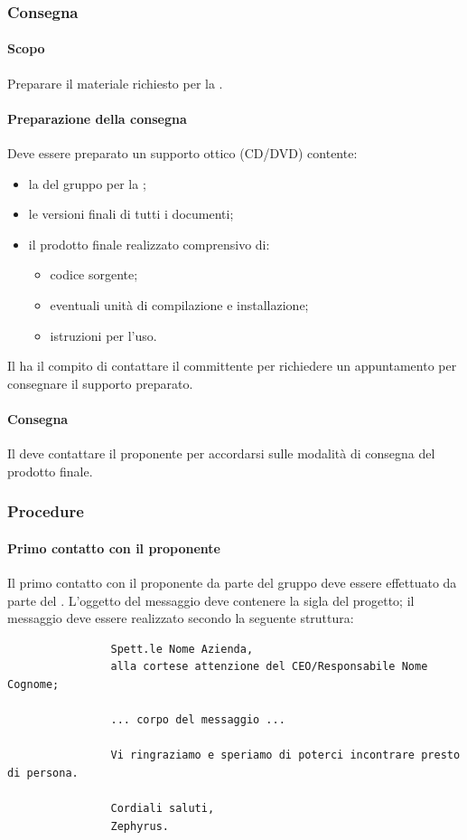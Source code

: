         \subsubsection{Consegna}
	        \paragraph{Scopo}
	        Preparare il materiale richiesto per la \revacc.
	        \paragraph{Preparazione della consegna}
	        Deve essere preparato un supporto ottico (CD/DVD) contente:
		    \begin{itemize}
		    	\item la \ldp{} del gruppo per la \revacc;
		    	\item le versioni finali di tutti i documenti;
		    	\item il prodotto finale realizzato comprensivo di:
			    	\begin{itemize}
			    		\item codice sorgente;
			    		\item eventuali unità di compilazione e installazione;
			    		\item istruzioni per l'uso.
			    	\end{itemize}
		    \end{itemize}
	        Il \responsabilediprogetto{} ha il compito di contattare il committente per richiedere un appuntamento per consegnare il supporto preparato.
	        \paragraph{Consegna}
	        Il \responsabilediprogetto{} deve contattare il proponente per accordarsi sulle modalità di consegna del prodotto finale.
		\subsubsection{Procedure}
			\paragraph{Primo contatto con il proponente}
			Il primo contatto con il proponente da parte del gruppo \zephyrus{} deve essere effettuato da parte del \responsabilediprogetto{}. L'oggetto del messaggio deve contenere la sigla del progetto; il messaggio deve essere realizzato secondo la seguente struttura:
			\bigskip
				\begin{verbatim}
				Spett.le Nome Azienda, 
				alla cortese attenzione del CEO/Responsabile Nome Cognome;
				
				... corpo del messaggio ...
				
				Vi ringraziamo e speriamo di poterci incontrare presto di persona.
				
				Cordiali saluti,
				Zephyrus.
				\end{verbatim}
